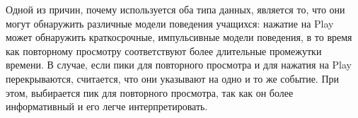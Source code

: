 Одной из причин, почему используется оба типа данных, является то, что они могут обнаружить различные модели поведения учащихся: нажатие на Play может обнаружить краткосрочные, импульсивные модели поведения, в то время как повторному просмотру соответствуют более длительные промежутки времени. В случае, если пики для повторного просмотра и для нажатия на Play перекрываются, считается, что они указывают на одно и то же событие. При этом, выбирается пик для повторного просмотра, так как он более информативный и его легче интерпретировать.


